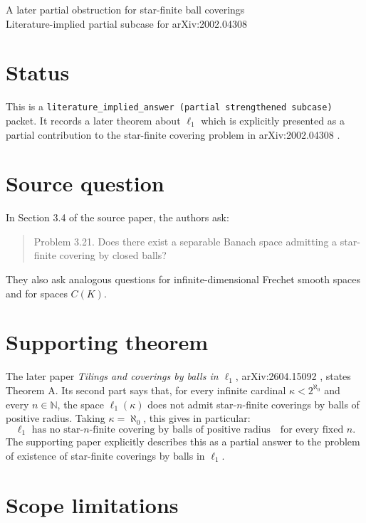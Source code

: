 \documentclass[11pt]{article}
\begin{document}
\begin{center}
{\Large A later partial obstruction for star-finite ball coverings}\\[4pt]
{\normalsize Literature-implied partial subcase for arXiv:2002.04308}
\end{center}

\section*{Status}

This is a \texttt{literature\_implied\_answer (partial strengthened subcase)}
packet.  It records a later theorem about \(\ell_1\) which is explicitly
presented as a partial contribution to the star-finite covering problem in
arXiv:2002.04308 \cite{DBSV}.

\section*{Source question}

In Section 3.4 of the source paper, the authors ask:
\begin{quote}
Problem 3.21. Does there exist a separable Banach space admitting a
star-finite covering by closed balls?
\end{quote}
They also ask analogous questions for infinite-dimensional Frechet smooth
spaces and for spaces \(C(K)\).

\section*{Supporting theorem}

The later paper \emph{Tilings and coverings by balls in \(\ell_1\)},
arXiv:2604.15092 \cite{DBRSS}, states Theorem A.  Its second part says that,
for every infinite cardinal \(\kappa<2^{\aleph_0}\) and every \(n\in\mathbb N\),
the space \(\ell_1(\kappa)\) does not admit star-\(n\)-finite coverings by
balls of positive radius.  Taking \(\kappa=\aleph_0\), this gives in particular:
\[
\ell_1 \text{ has no star-}n\text{-finite covering by balls of positive radius}
\quad\text{for every fixed }n.
\]
The supporting paper explicitly describes this as a partial answer to the
problem of existence of star-finite coverings by balls in \(\ell_1\).

\section*{Scope limitations}
\end{document}
